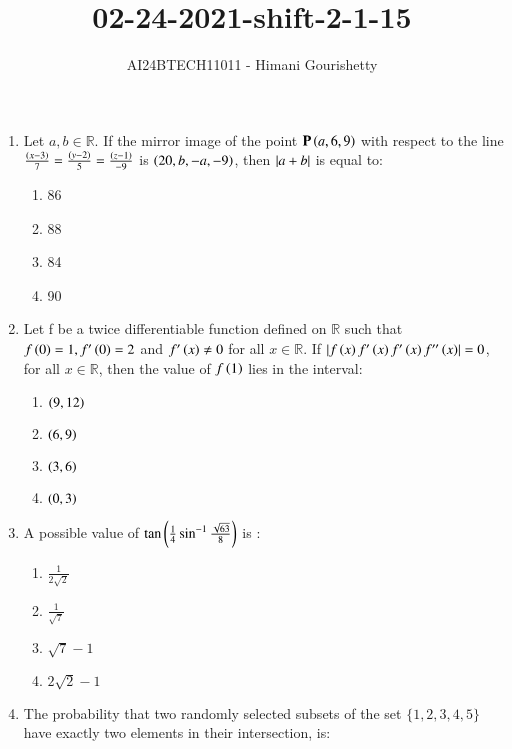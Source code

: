 \documentclass[journal,12pt,onecolumn]{IEEEtran}
\theoremstyle{remark}
\begin{document}

\vspace{3cm}

\title{02-24-2021-shift-2-1-15}
\author{AI24BTECH11011 - Himani Gourishetty}
\maketitle
\bigskip

\renewcommand{\thefigure}{\theenumi}
\renewcommand{\thetable}{\theenumi}
\begin{enumerate}
	\item Let $a,b \in \mathbb{R}$. If the mirror image of the point $\mathbf{P}\left(a,6,9\right)$ with respect to the line $\frac{\left(x-3\right)}{7}=\frac{\left(y-2\right)}{5}=\frac{\left(z-1\right)}{-9}$ is $\left(20,b,-a,-9\right)$, then $\left\vert a+b\right\vert$ is equal to:
    \begin{enumerate}
        \item 86
        \item 88
        \item 84
        \item 90
    \end{enumerate}
    \item Let f be a twice differentiable function defined on $\mathbb{R}$ such that $f\left(0\right)=1,f^{\prime}\left(0\right)=2$ and $f^{\prime}\left(x\right)\neq0$ for all $x \in\mathbb{R}$. If $\left\vert f\left(x\right)f^{\prime}\left(x\right)f^{\prime}\left(x\right)f''\left(x\right)\right\vert=0$, for all $x \in \mathbb{R}$, then the value of $f\left(1\right)$ lies in the interval:
    \begin{enumerate}
        \item $\left(9,12\right)$
        \item $\left(6,9\right)$
        \item $\left(3,6\right)$
        \item $\left(0,3\right)$
    \end{enumerate}
    \item A possible value of $\tan\left(\frac{1}{4}\sin^{-1}\frac{\sqrt{63}}{8}\right)$ is :
    \begin{enumerate}
        \item $\frac{1}{2\sqrt{2}}$
        \item $\frac{1}{\sqrt{7}}$
        \item $\sqrt{7}-1$
        \item $2\sqrt{2}-1$
    \end{enumerate}
    \item The probability that two randomly selected subsets of the set $\{1,2,3,4,5\}$ have exactly two elements in their intersection, is:

\end{enumerate}
\end{document}
